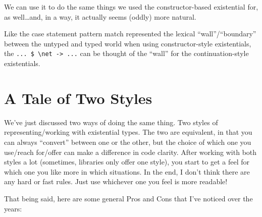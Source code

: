 \documentclass[]{article}
\newenvironment{Shaded}{}{}
\newcommand{\KeywordTok}[1]{\textcolor[rgb]{0.00,0.44,0.13}{\textbf{{#1}}}}
\newcommand{\DataTypeTok}[1]{\textcolor[rgb]{0.56,0.13,0.00}{{#1}}}
\newcommand{\DecValTok}[1]{\textcolor[rgb]{0.25,0.63,0.44}{{#1}}}
\newcommand{\StringTok}[1]{\textcolor[rgb]{0.25,0.44,0.63}{{#1}}}
\newcommand{\CommentTok}[1]{\textcolor[rgb]{0.38,0.63,0.69}{\textit{{#1}}}}
\newcommand{\OtherTok}[1]{\textcolor[rgb]{0.00,0.44,0.13}{{#1}}}
\newcommand{\FunctionTok}[1]{\textcolor[rgb]{0.02,0.16,0.49}{{#1}}}
\newcommand{\NormalTok}[1]{{#1}}
\begin{document}
We can use it to do the same things we used the constructor-based existential
for, as well\ldots{}and, in a way, it actually seems (oddly) more natural.

\begin{Shaded}
\end{Shaded}

Like the case statement pattern match represented the lexical
``wall''/``boundary'' between the untyped and typed world when using
constructor-style existentials, the
\texttt{...\ \$\ \textbackslash{}net\ -\textgreater{}\ ...} can be thought of
the ``wall'' for the continuation-style existentials.

\section{A Tale of Two Styles}\label{a-tale-of-two-styles}

We've just discussed two ways of doing the same thing. Two styles of
representing/working with existential types. The two are equivalent, in that you
can always ``convert'' between one or the other, but the choice of which one you
use/reach for/offer can make a difference in code clarity. After working with
both styles a lot (sometimes, libraries only offer one style), you start to get
a feel for which one you like more in which situations. In the end, I don't
think there are any hard or fast rules. Just use whichever one you feel is more
readable!

That being said, here are some general Pros and Cons that I've noticed over the
years:
\end{document}
